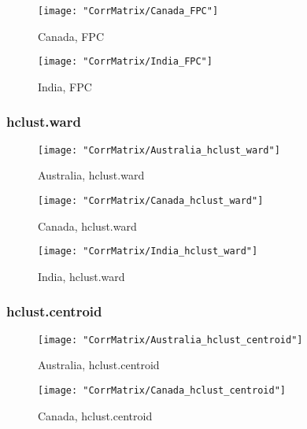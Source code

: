 \documentclass[a4paper]{article}
\begin{document}
\begin{figure}[H]
\begin{center}
\texttt{[image: "CorrMatrix/Canada\_FPC"]}
\caption{Canada,  FPC}
\label{fig:2}
\end{center}
\end{figure}

\begin{figure}[H]
\begin{center}
\texttt{[image: "CorrMatrix/India\_FPC"]}
\caption{India,  FPC}
\label{fig:2}
\end{center}
\end{figure}

\subsubsection{hclust.ward}

\begin{figure}[H]
\begin{center}
\texttt{[image: "CorrMatrix/Australia\_hclust\_ward"]}
\caption{Australia,  hclust.ward}
\label{fig:2}
\end{center}
\end{figure}

\begin{figure}[H]
\begin{center}
\texttt{[image: "CorrMatrix/Canada\_hclust\_ward"]}
\caption{Canada,  hclust.ward}
\label{fig:2}
\end{center}
\end{figure}

\begin{figure}[H]
\begin{center}
\texttt{[image: "CorrMatrix/India\_hclust\_ward"]}
\caption{India,  hclust.ward}
\label{fig:2}
\end{center}
\end{figure}

\subsubsection{hclust.centroid}

\begin{figure}[H]
\begin{center}
\texttt{[image: "CorrMatrix/Australia\_hclust\_centroid"]}
\caption{Australia,  hclust.centroid}
\label{fig:2}
\end{center}
\end{figure}

\begin{figure}[H]
\begin{center}
\texttt{[image: "CorrMatrix/Canada\_hclust\_centroid"]}
\caption{Canada,  hclust.centroid}
\label{fig:2}
\end{center}
\end{figure}
\end{document}

